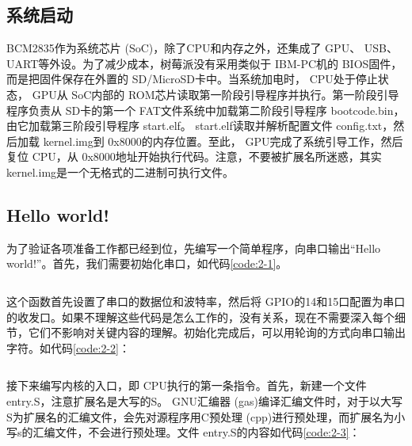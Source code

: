 \documentclass[main.tex]{subfiles}
\begin{document}
\ifxetex\else\begin{CJK*}{UTF8}{song}\fi

\chapter{系统启动}
\justify
BCM2835作为系统芯片 (SoC)，除了CPU和内存之外，还集成了 GPU、 USB、 UART等外设。为了减少成本，树莓派没有采用类似于 IBM-PC机的 BIOS固件，而是把固件保存在外置的 SD\-/\-MicroSD卡中。当系统加电时， CPU处于停止状态， GPU从 SoC内部的 ROM芯片读取第一阶段引导程序并执行。第一阶段引导程序负责从 SD卡的第一个 FAT文件系统中加载第二阶段引导程序 boot\-code.bin，由它加载第三阶段引导程序 start.elf。 start.elf读取并解析配置文件 config.txt，然后加载 kernel.img到 0x8000的内存位置。至此， GPU完成了系统引导工作，然后复位 CPU，从 0x8000地址开始执行代码。注意，不要被扩展名所迷惑，其实 kernel.img是一个无格式的二进制可执行文件。

\section{Hello world!}
为了验证各项准备工作都已经到位，先编写一个简单程序，向串口输出“Hello world!”。首先，我们需要初始化串口，如代码\ref{code:2-1}。

\begin{code}
\label{code:2-1}
\inputminted[firstline=6,lastline=38,linenos,numbersep=5pt,frame=lines,framesep=2mm]{c}{src/chapter02/kernel/machdep.c}
\end{code}

这个函数首先设置了串口的数据位和波特率，然后将 GPIO的14和15口配置为串口的收发口。如果不理解这些代码是怎么工作的，没有关系，现在不需要深入每个细节，它们不影响对关键内容的理解。初始化完成后，可以用轮询的方式向串口输出字符。如代码\ref{code:2-2}：

\begin{code}
\label{code:2-2}
\inputminted[firstline=40,lastline=48,linenos,numbersep=5pt,frame=lines,framesep=2mm]{c}{src/chapter02/kernel/machdep.c}
\end{code}

\par
接下来编写内核的入口，即 CPU执行的第一条指令。首先，新建一个文件 entry.S，注意扩展名是大写的S。 GNU汇编器 (gas)编译汇编文件时，对于以大写S为扩展名的汇编文件，会先对源程序用C预处理 (cpp)进行预处理，而扩展名为小写s的汇编文件，不会进行预处理。文件 entry.S的内容如代码\ref{code:2-3}：


\end{CJK*}
\end{document}
